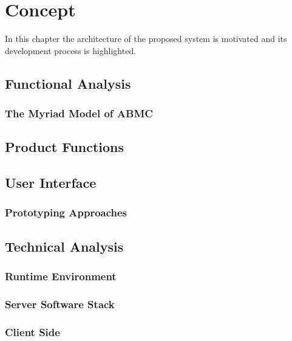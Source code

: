 \chapter{Concept}
\label{chapter:Concept}

In this chapter the architecture of the proposed system is motivated and its development process is highlighted.

\section{Functional Analysis}
\label{section:FunctionalAnalysis}

\pagebreak
\subsection{The Myriad Model of ABMC}

\section{Product Functions}

\section{User Interface}

\subsection{Prototyping Approaches}

\section{Technical Analysis}

\subsection{Runtime Environment}

\subsection{Server Software Stack}

\subsection{Client Side}

